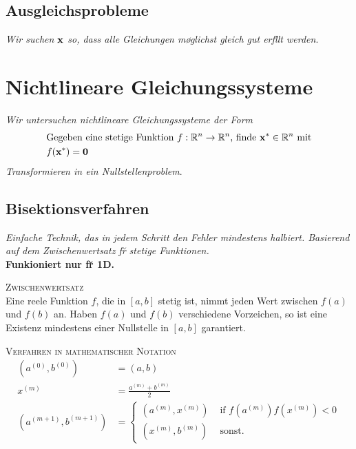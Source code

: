 \subsection{Ausgleichsprobleme}
\emph{Wir suchen $\mbox{\bf x}$ so, dass alle Gleichungen m\o glichst gleich gut erf\u llt werden}.

\section{Nichtlineare Gleichungssysteme}
\emph{Wir untersuchen nichtlineare Gleichungssysteme der Form}
\begin{align*}
&\text{Gegeben eine stetige Funktion $f:\mathbb{R}^{n} \rightarrow \mathbb{R}^{n}$, finde $\mbox{\bf x}^* \in \mathbb{R}^{n}$ mit} \\
&f(\mbox{\bf x}^*) = \mbox{\bf 0}
\end{align*}
\emph{Transformieren in ein Nullstellenproblem}.
\subsection{Bisektionsverfahren}
\emph{Einfache Technik, das in jedem Schritt den Fehler mindestens halbiert. Basierend auf dem Zwischenwertsatz f\u r stetige Funktionen.}\\
\textbf{Funkioniert nur f\u r 1D.}\vspace{0.2cm}

\textsc{Zwischenwertsatz}\\
Eine reele Funktion $f$, die in $[a,b]$ stetig ist, nimmt jeden Wert zwischen $f(a)$ und $f(b)$ an. Haben $f(a)$ und $f(b)$ verschiedene Vorzeichen, so ist eine Existenz mindestens einer Nullstelle in $[a,b]$ garantiert.\vspace{0.2cm}

\textsc{Verfahren in mathematischer Notation}\\
\begin{align*}
(a^{(0)}, b^{(0)}) &= (a,b)\\
x^{(m)} &= \frac{a^{(m)} + b^{(m)}}{2} \\
(a^{(m+1)}, b^{(m+1)}) &= \begin{cases}
(a^{(m)}, x^{(m)}) & \text{ if } f(a^{(m)})f(x^{(m)}) < 0 \\
(x^{(m)}, b^{(m)}) & \text{ sonst.}
\end{cases}
\end{align*}


